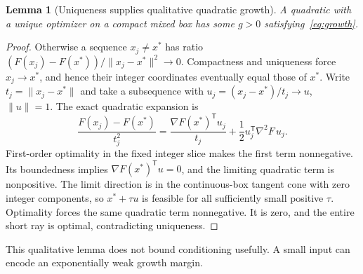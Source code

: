\documentclass[11pt]{article}
\newtheorem{lemma}[theorem]{Lemma}
\theoremstyle{remark}
\newcommand{\norm}[1]{\lVert#1\rVert}
\begin{document}
\begin{lemma}[Uniqueness supplies qualitative quadratic growth]
A quadratic with a unique optimizer on a compact mixed box has some
$g>0$ satisfying~\eqref{eq:growth}.
\end{lemma}
\begin{proof}
Otherwise a sequence $x_j\ne x^*$ has ratio
$(F(x_j)-F(x^*))/\norm{x_j-x^*}^2\to0$. Compactness and uniqueness
force $x_j\to x^*$, and hence their integer coordinates eventually
equal those of $x^*$. Write $t_j=\norm{x_j-x^*}$ and take a subsequence
with $u_j=(x_j-x^*)/t_j\to u$, $\norm u=1$. The exact quadratic
expansion is
\[
\frac{F(x_j)-F(x^*)}{t_j^2}
=\frac{\nabla F(x^*)^{\mathsf T}u_j}{t_j}
+\frac12u_j^{\mathsf T}\nabla^2F\,u_j.
\]
First-order optimality in the fixed integer slice makes the first term
nonnegative. Its boundedness implies $\nabla F(x^*)^{\mathsf T}u=0$,
and the limiting quadratic term is nonpositive. The limit direction is
in the continuous-box tangent cone with zero integer components, so
$x^*+\tau u$ is feasible for all sufficiently small positive $\tau$.
Optimality forces the same quadratic term nonnegative. It is zero,
and the entire short ray is optimal, contradicting uniqueness.
\end{proof}

This qualitative lemma does not bound conditioning usefully. A small
input can encode an exponentially weak growth margin.
\end{document}
